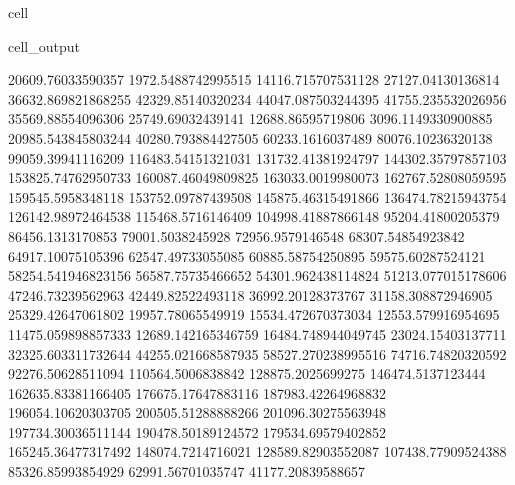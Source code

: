 \documentclass[letterpaper,10pt,english]{jupyterBook}
\begin{document}
\begin{sphinxuseclass}{cell}
\begin{sphinxVerbatimOutput}
\begin{sphinxuseclass}{cell_output}
\begin{sphinxVerbatim}[commandchars=\\\{\}]
20609.76033590357  1972.5488742995515  \PYGZhy{}14116.715707531128  \PYGZhy{}27127.04130136814  \PYGZhy{}36632.869821868255  \PYGZhy{}42329.85140320234  \PYGZhy{}44047.087503244395  \PYGZhy{}41755.235532026956  \PYGZhy{}35569.88554096306  \PYGZhy{}25749.69032439141  \PYGZhy{}12688.86595719806  3096.1149330900885  20985.543845803244  40280.793884427505  60233.1616037489  80076.10236320138  99059.39941116209  116483.54151321031  131732.41381924797  144302.35797857103  153825.74762950733  160087.46049809825  163033.0019980073  162767.52808059595  159545.5958348118  153752.09787439508  145875.46315491866  136474.78215943754  126142.98972464538  115468.5716146409  104998.41887866148  95204.41800205379  86456.1313170853  79001.5038245928  72956.9579146548  68307.54854923842  64917.10075105396  62547.49733055085  60885.58754250895  59575.60287524121  58254.541946823156  56587.75735466652  54301.962438114824  51213.077015178606  47246.73239562963  42449.82522493118  36992.20128373767  31158.308872946905  25329.42647061802  19957.78065549919  15534.472670373034  12553.579916954695  11475.059898857333  12689.142165346759  16484.748944049745  23024.15403137711  32325.603311732644  44255.021668587935  58527.270238995516  74716.74820320592  92276.50628511094  110564.5006838842  128875.2025699275  146474.5137123444  162635.83381166405  176675.17647883116  187983.42264968832  196054.10620303705  200505.51288888266  201096.30275563948  197734.30036511144  190478.50189124572  179534.69579402852  165245.36477317492  148074.7214716021  128589.82903552087  107438.77909524388  85326.85993854929  62991.56701035747  41177.20839588657  

\end{sphinxVerbatim}
\end{sphinxuseclass}
\end{sphinxVerbatimOutput}
\end{sphinxuseclass}
\end{document}
